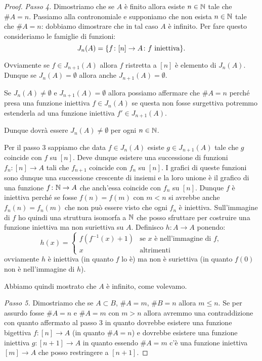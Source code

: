 \begin{proof}
\emph{Passo 4.}
Dimostriamo che se $A$ è finito allora esiste $n\in {\mathbb N}$ tale che $\#A=n$.
Passiamo alla contronomiale e supponiamo che non esista $n\in {\mathbb N}$ tale che $\#A=n$:
dobbiamo dimostrare che in tal caso $A$ è infinito.
Per fare questo consideriamo le famiglie di funzioni:
\[
  J_n(A) = {\left\{ f\colon [n]\to A\colon f \text{ iniettiva} \right\}}.
\]

Ovviamente se $f\in J_{n+1}(A)$ allora $f$ ristretta a $[n]$ è elemento di $J_n(A)$.
Dunque se $J_n(A)=\emptyset$ allora anche $J_{n+1}(A)=\emptyset$.
 
Se $J_n(A)\neq \emptyset$ e $J_{n+1}(A)=\emptyset$ allora possiamo affermare che $\#A=n$ 
perché presa una funzione iniettiva $f\in J_n(A)$ se questa non fosse surgettiva potremmo 
estenderla ad una funzione iniettiva $f'\in J_{n+1}(A)$.

Dunque dovrà essere $J_n(A)\neq \emptyset$ per ogni $n\in {\mathbb N}$.

Per il passo 3 sappiamo che data 
$f\in J_n(A)$ esiste $g\in J_{n+1}(A)$
tale che $g$ coincide con $f$ su $[n]$. 
Deve dunque esistere una successione di funzioni
$f_n\colon [n]\to A$ tali che $f_{n+1}$ coincide con $f_n$ su $[n]$.
I grafici di queste funzioni sono dunque una successione crescente di insiemi e la loro 
unione è il grafico di una funzione $f\colon {\mathbb N} \to A$ che anch'essa 
coincide con $f_n$ su $[n]$. 
Dunque $f$ è iniettiva perché se fosse $f(n)=f(m)$
con $m<n$ si avrebbe anche $f_n(n)=f_n(m)$ che non può essere visto che ogni $f_n$ è iniettiva.
Sull'immagine di $f$ ho quindi una struttura isomorfa a ${\mathbb N}$ che posso sfruttare per 
costruire una funzione iniettiva ma non suriettiva su $A$.
Definisco $h\colon A\to A$ ponendo:
\[
  h(x) = \begin{cases}
    f(f^{-1}(x)+1) &\text{se $x$ è nell'immagine di $f$},\\
    x &\text{altrimenti}
  \end{cases}
\]
ovviamente $h$ è iniettiva (in quanto $f$ lo è) 
ma non è suriettiva (in quanto $f(0)$ non è nell'immagine di $h$).

Abbiamo quindi mostrato che $A$ è infinito, come volevamo.

\emph{Passo 5.}
Dimostriamo che se $A\subset B$, $\#A=m$, $\#B=n$ allora $m\le n$.
Se per assurdo fosse $\#A=n$ e $\#A=m$ con $m>n$ allora 
avremmo una contraddizione con quanto affermato al passo 3
in quanto dovrebbe esistere una funzione bigettiva $f\colon[n]\to A$ 
(in quanto $\#A=n$) e dovrebbe esistere una funzione iniettiva 
$g\colon[n+1]\to A$ in quanto essendo $\#A=m$ c'è una funzione iniettiva 
$[m]\to A$ che posso restringere a $[n+1]$.
\end{proof}

